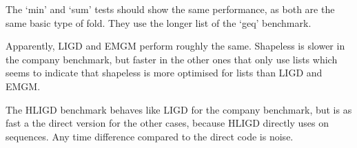 The `min' and `sum' tests should show the same performance, as both are the
same basic type of fold. They use the longer list of the `geq' benchmark.

Apparently, LIGD and EMGM perform roughly the same. Shapeless is slower in the
company benchmark, but faster in the other ones that only use lists which seems
to indicate that shapeless is more optimised for lists than LIGD and EMGM.

The HLIGD benchmark behaves like LIGD for the company benchmark, but is as fast
a the direct version for the other cases, because HLIGD directly uses
 on sequences. Any time difference compared to the direct code is
noise.
